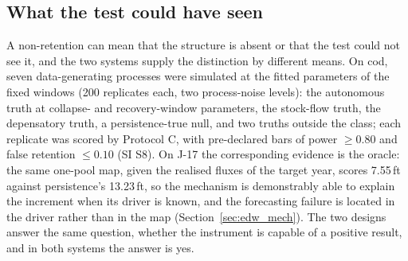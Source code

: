 \subsection{What the test could have seen}\label{sec:power}

A non-retention can mean that the structure is absent or that the test could not see it, and the two systems supply the distinction by different means. On cod, seven data-generating processes were simulated at the fitted parameters of the fixed windows (200 replicates each, two process-noise levels): the autonomous truth at collapse- and recovery-window parameters, the stock-flow truth, the depensatory truth, a persistence-true null, and two truths outside the class; each replicate was scored by Protocol C, with pre-declared bars of power $\ge 0.80$ and false retention $\le 0.10$ (SI S8). On J-17 the corresponding evidence is the oracle: the same one-pool map, given the realised fluxes of the target year, scores 7.55\,ft against persistence's 13.23\,ft, so the mechanism is demonstrably able to explain the increment when its driver is known, and the forecasting failure is located in the driver rather than in the map (Section~\ref{sec:edw_mech}). The two designs answer the same question, whether the instrument is capable of a positive result, and in both systems the answer is yes.
